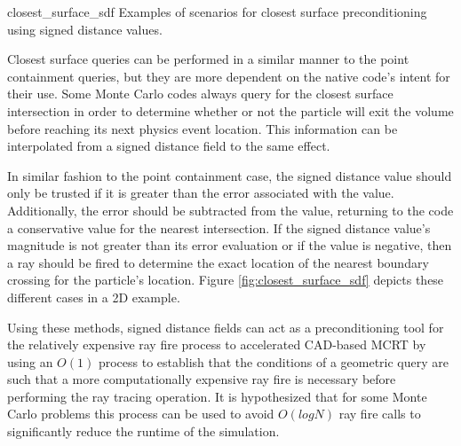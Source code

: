              {closest_surface_sdf}
             {Examples of scenarios for closest surface preconditioning using signed distance values.}
             {
               Closest surface queries can be performed in a similar manner to
               the point containment queries, but they are more dependent on the
               native code's intent for their use. Some Monte Carlo codes always
               query for the closest surface intersection in order to
               determine whether or not the particle will exit the volume before
               reaching its next physics event location. This information can be
               interpolated from a signed distance field to the same effect.
               
               In similar fashion to the point containment case, the signed
               distance value should only be trusted if it is greater than the
               error associated with the value. Additionally, the error should
               be subtracted from the value, returning to the code a
               conservative value for the nearest intersection. If the signed
               distance value's magnitude is not greater than its error
               evaluation or if the value is negative, then a ray should be
               fired to determine the exact location of the nearest boundary
               crossing for the particle's location. Figure
               \ref{fig:closest_surface_sdf} depicts these different cases in a
               2D example.
             }


\bigskip
             
Using these methods, signed distance fields can act as a preconditioning tool
for the relatively expensive ray fire process to accelerated CAD-based MCRT by
using an $O(1)$ process to establish that the conditions of a geometric query
are such that a more computationally expensive ray fire is necessary before
performing the ray tracing operation. It is hypothesized that for some Monte
Carlo problems this process can be used to avoid $O(logN)$ ray fire calls to
significantly reduce the runtime of the simulation.


